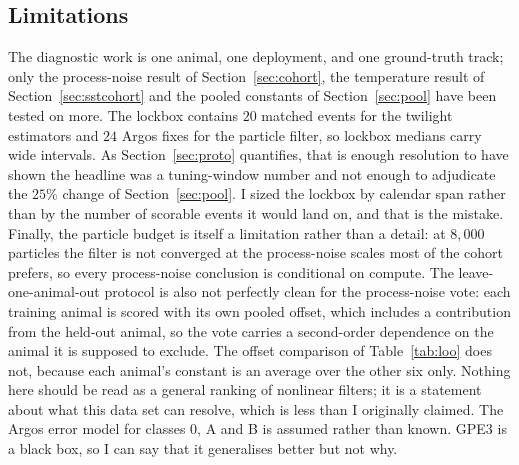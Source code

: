 \documentclass[conference]{IEEEtran}
\begin{document}
\subsection{Limitations}
The diagnostic work is one animal, one deployment, and one ground-truth track;
only the process-noise result of Section~\ref{sec:cohort}, the temperature
result of Section~\ref{sec:sstcohort} and the pooled constants of
Section~\ref{sec:pool} have been tested on more. The lockbox contains $20$
matched events for the twilight estimators and $24$ Argos fixes for the
particle filter, so lockbox medians carry wide intervals. As
Section~\ref{sec:proto} quantifies, that is enough resolution to have shown the
headline was a tuning-window number and not enough to adjudicate the $25\%$
change of Section~\ref{sec:pool}. I sized the lockbox by calendar span rather
than by the number of scorable events it would land on, and that is the
mistake. Finally, the
particle budget is itself a limitation rather than a detail: at $8{,}000$
particles the filter is not converged at the process-noise scales most of the
cohort prefers, so every process-noise conclusion is conditional on compute. The leave-one-animal-out protocol is also not perfectly clean for the
process-noise vote: each training animal is scored with its own pooled offset,
which includes a contribution from the held-out animal, so the vote carries a
second-order dependence on the animal it is supposed to exclude. The offset
comparison of Table~\ref{tab:loo} does not, because each animal's constant is
an average over the other six only. Nothing here should be read as a general ranking of
nonlinear filters; it is a statement about what this data set can resolve, which
is less than I originally claimed. The Argos error model for classes 0, A and B
is assumed rather than known. GPE3 is a black box, so I can say that it
generalises better but not why.
\end{document}
